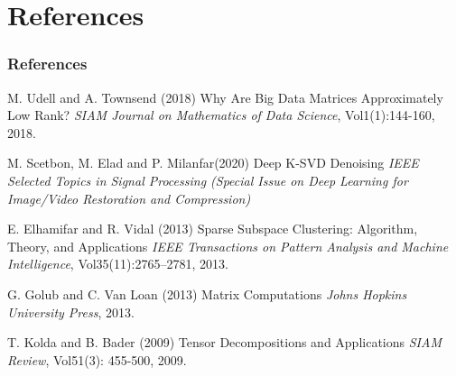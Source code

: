 \documentclass[aspectratio=2516]{beamer}
\begin{document}
\section{References}
\begin{frame}
\frametitle{References}
\footnotesize{
	\begin{thebibliography}{99} %
		 M. Udell  and A. Townsend (2018)
		\newblock Why Are Big Data Matrices Approximately Low Rank?
		\newblock \emph{SIAM Journal on Mathematics of Data Science}, Vol1(1):144-160, 2018.
	\end{thebibliography}
	\begin{thebibliography}{99} 
		M. Scetbon, M. Elad and P. Milanfar(2020)
		\newblock Deep K-SVD Denoising
		\newblock \emph{IEEE Selected Topics in Signal Processing (Special Issue on Deep Learning for Image/Video Restoration and Compression)}
	\end{thebibliography}
	\begin{thebibliography}{99} 
		 E. Elhamifar and R. Vidal (2013)
		\newblock Sparse Subspace Clustering: Algorithm, Theory, and Applications
		\newblock \emph{IEEE Transactions on Pattern Analysis and Machine Intelligence}, Vol35(11):2765--2781, 2013.
	\end{thebibliography}
	\begin{thebibliography}{99} 
		 G. Golub and C. Van Loan (2013)
		\newblock Matrix Computations
		\newblock \emph{Johns Hopkins University Press}, 2013.
	\end{thebibliography}
	\begin{thebibliography}{99}
		 T. Kolda and B. Bader (2009)
		\newblock  Tensor Decompositions and Applications
		\newblock \emph{SIAM Review}, Vol51(3): 455-500, 2009.
	\end{thebibliography}
}
\end{frame}

\end{document}

